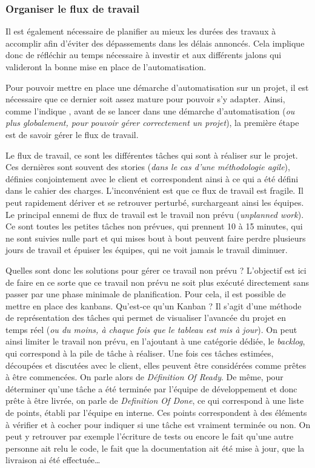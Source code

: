 \subsubsection{Organiser le flux de travail}
Il est également nécessaire de planifier au mieux les durées des travaux à accomplir afin d'éviter des dépassements dans les délais annoncés. Cela implique donc de réfléchir au temps nécessaire à investir et aux différents jalons qui valideront la bonne mise en place de l'automatisation. 

Pour pouvoir mettre en place une démarche d'automatisation sur un projet, il est nécessaire que ce dernier soit assez mature pour pouvoir s'y adapter. Ainsi, comme l'indique  \cite{phoenixProject}, avant de se lancer dans une démarche d'automatisation (\emph{ou plus globalement, pour pouvoir gérer correctement un projet}), la première étape est de savoir gérer le flux de travail.

Le flux de travail, ce sont les différentes tâches qui sont à réaliser sur le projet. Ces dernières sont souvent des stories (\emph{dans le cas d'une méthodologie agile}), définies conjointement avec le client et correspondent ainsi à ce qui a été défini dans le cahier des charges. L'inconvénient est que ce flux de travail est fragile. Il peut rapidement dériver et se retrouver perturbé, surchargeant ainsi les équipes. Le principal ennemi de flux de travail est le travail non prévu (\emph{unplanned work}). Ce sont toutes les petites tâches non prévues, qui prennent 10 à 15 minutes, qui ne sont suivies nulle part et qui mises bout à bout peuvent faire perdre plusieurs jours de travail et épuiser les équipes, qui ne voit jamais le travail diminuer.

Quelles sont donc les solutions pour gérer ce travail non prévu ? L'objectif est ici de faire en ce sorte que ce travail non prévu ne soit plus exécuté directement sans passer par une phase minimale de planification. Pour cela, il est possible de mettre en place des kanbans. Qu'est-ce qu'un Kanban ? Il s'agit d'une méthode de représentation des tâches qui permet de visualiser l'avancée du projet en temps réel (\emph{ou du moins, à chaque fois que le tableau est mis à jour}). On peut ainsi limiter le travail non prévu, en l'ajoutant à une catégorie dédiée, le \emph{backlog}, qui correspond à la pile de tâche à réaliser. Une fois ces tâches estimées, découpées et discutées avec le client, elles peuvent être considérées comme prêtes à être commencées. On parle alors de \emph{Définition Of Ready}. De même, pour déterminer qu'une tâche a été terminée par l'équipe de développement et donc prête à être livrée, on parle de \emph{Definition Of Done}, ce qui correspond à une liste de points, établi par l'équipe en interne. Ces points correspondent à des éléments à vérifier et à cocher pour indiquer si une tâche est vraiment terminée ou non. On peut y retrouver par exemple l'écriture de tests ou encore le fait qu'une autre personne ait relu le code, le fait que la documentation ait été mise à jour, que la livraison ai été effectuée\ldots

